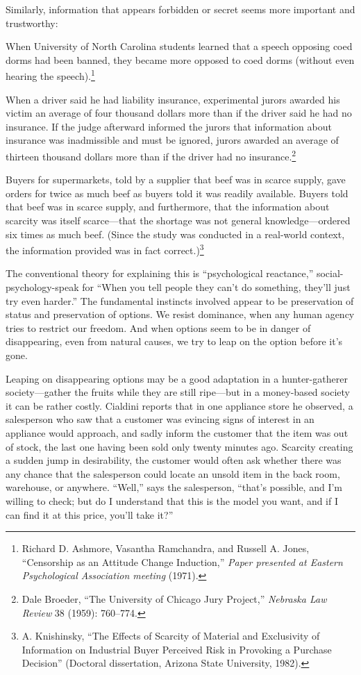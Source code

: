 {
 Similarly, information that appears forbidden or secret seems more
important and trustworthy:}

{
 When University of North Carolina students learned that a speech
opposing coed dorms had been banned, they became more opposed to coed
dorms (without even hearing the speech).\footnote{Richard D. Ashmore, Vasantha Ramchandra, and Russell A. Jones,
``Censorship as an Attitude Change
Induction,'' \textit{Paper presented at Eastern
Psychological Association meeting} (1971).}}

{
 When a driver said he had liability insurance, experimental jurors
awarded his victim an average of four thousand dollars more than if the
driver said he had no insurance. If the judge afterward informed the
jurors that information about insurance was inadmissible and must be
ignored, jurors awarded an average of thirteen thousand dollars more
than if the driver had no insurance.\footnote{Dale Broeder, ``The University of Chicago Jury
Project,'' \textit{Nebraska Law Review} 38 (1959):
760--774.}}

{
 Buyers for supermarkets, told by a supplier that beef was in
scarce supply, gave orders for twice as much beef as buyers told it was
readily available. Buyers told that beef was in scarce supply, and
furthermore, that the information about scarcity was itself
scarce---that the shortage was not general knowledge---ordered six
times as much beef. (Since the study was conducted in a real-world
context, the information provided was in fact
correct.)\footnote{A. Knishinsky, ``The Effects of Scarcity of
Material and Exclusivity of Information on Industrial Buyer Perceived
Risk in Provoking a Purchase Decision'' (Doctoral
dissertation, Arizona State University, 1982).}}

{
 The conventional theory for explaining this is
``psychological reactance,''
social-psychology-speak for ``When you tell people
they can't do something, they'll just
try even harder.'' The fundamental instincts involved
appear to be preservation of status and preservation of options. We
resist dominance, when any human agency tries to restrict our freedom.
And when options seem to be in danger of disappearing, even from
natural causes, we try to leap on the option before
it's gone.}

{
 Leaping on disappearing options may be a good adaptation in a
hunter-gatherer society---gather the fruits while they are still
ripe---but in a money-based society it can be rather costly. Cialdini
reports that in one appliance store he observed, a salesperson who saw
that a customer was evincing signs of interest in an appliance would
approach, and sadly inform the customer that the item was out of stock,
the last one having been sold only twenty minutes ago. Scarcity
creating a sudden jump in desirability, the customer would often ask
whether there was any chance that the salesperson could locate an
unsold item in the back room, warehouse, or anywhere.
``Well,'' says the salesperson,
``that's possible, and
I'm willing to check; but do I understand that this is
the model you want, and if I can find it at this price,
you'll take it?''}

